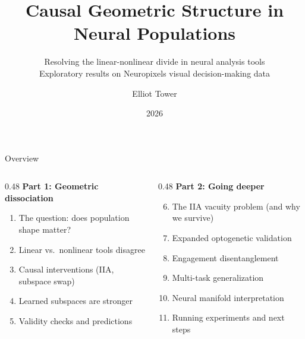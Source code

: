 \documentclass[aspectratio=169,11pt]{beamer}
\title{Causal Geometric Structure in Neural Populations}
\subtitle{Resolving the linear-nonlinear divide in neural analysis tools\\[0.3em]
{\small Exploratory results on Neuropixels visual decision-making data}}
\author{Elliot Tower}
\date{2026}
\institute{}
\begin{document}
\maketitle

\begin{frame}{Overview}

\begin{columns}[T]
\begin{column}{0.48\textwidth}
\textbf{Part 1: Geometric dissociation}
\begin{enumerate}
  \item The question: does population shape matter?
  \item Linear vs.\ nonlinear tools disagree
  \item Causal interventions (IIA, subspace swap)
  \item Learned subspaces are stronger
  \item Validity checks and predictions
\end{enumerate}
\end{column}
\begin{column}{0.48\textwidth}
\textbf{Part 2: Going deeper}
\begin{enumerate}
  \setcounter{enumi}{5}
  \item The IIA vacuity problem (and why we survive)
  \item Expanded optogenetic validation
  \item Engagement disentanglement
  \item Multi-task generalization
  \item Neural manifold interpretation
  \item Running experiments and next steps
\end{enumerate}
\end{column}
\end{columns}
\end{frame}


\begin{frame}[plain]
\vfill
\begin{center}
  \setlength{\fboxrule}{2.5pt}%
\end{center}
\vfill
\end{frame}
\end{document}

